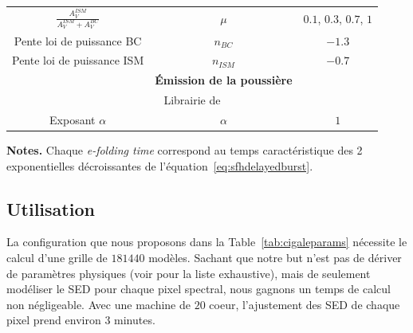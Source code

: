 \documentclass[../main/main.tex]{subfiles}
\begin{document}
\begin{table}[h]
{\begin{tabularx}{1.2\textwidth}{ccc}
                               $\frac{A_{V}^{ISM}}{A_{V}^{ISM}+A_{V}^{BC}}$
                                                   & $\mu$ & $0.1$,
                                                             $0.3$,
                                                             $0.7$,
                                                             $1$\\
                               Pente loi de puissance BC & $n_{BC}$&
                                                                     $-1.3$\\
                               Pente loi de puissance ISM & $n_{ISM}$& $-0.7$\\
                               \hline
                                                   & \textbf{\'Emission
                                                     de la
                                                     poussière}&\\
                               \multicolumn{3}{c}{Librairie de \citet{Dale2014}}\hspace{-1.1cm}\\
                               \hline
                               Exposant $\alpha$ & $\alpha$ & $1$\\

                               \bottomrule
        \end{tabularx}}
        \begin{tablenotes}[flushleft]
        \item \textbf{Notes.} Chaque \textit{e-folding time} correspond au
          temps caractéristique des 2 exponentielles décroissantes de
          l'équation~\ref{eq:sfhdelayedburst}. 
        \end{tablenotes}
      
    \end{table}
    
\subsection{Utilisation}
    
La configuration que nous proposons dans la Table~\ref{tab:cigaleparams}
nécessite le calcul d'une grille de $181440$ modèles. Sachant que notre
but n'est pas de dériver de paramètres physiques (voir
\citet{Boquien2019} pour la liste exhaustive), mais de seulement modéliser le
SED pour chaque pixel spectral, nous
gagnons un temps de calcul non négligeable. 
Avec une machine de $20$ coeur, l'ajustement des SED de chaque pixel prend environ $3$ minutes.
\end{document}
